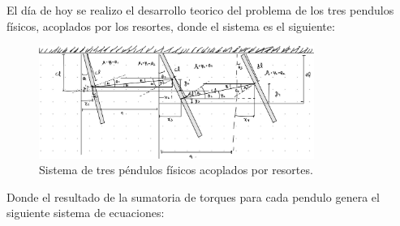 \documentclass[fontsize=11pt,
  paper=a4paper,
  twoside,
  captions=tableheading,
  index=totoc,
  hyperref]{labbook}
\begin{document}

\title{\fontsize{40pt}{40pt}}

\author{
   \and {}
  \and {}
}
\date{}

\maketitle

\printindex
\tableofcontents
\newpage

\begin{addmargin}[4cm]{0cm}

\pagestyle{scrheadings}





El día de hoy se realizo el desarrollo teorico del problema de los tres pendulos físicos, acoplados por los resortes, donde el sistema es el siguiente:
\begin{figure}[h!]
 
  \includegraphics[width=0.8\textwidth]{Figures/IM1.jpeg}

  \caption{Sistema de tres péndulos físicos acoplados por resortes.}
  \label{fig:sistema_pendulos}
\end{figure}
Donde el resultado de la sumatoria de torques para cada pendulo genera el siguiente sistema de ecuaciones:


\end{addmargin}
\end{document}
